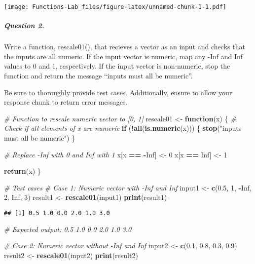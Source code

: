 \documentclass[
]{article}
\newenvironment{Shaded}{\begin{snugshade}}{\end{snugshade}}
\newcommand{\CommentTok}[1]{\textcolor[rgb]{0.56,0.35,0.01}{\textit{#1}}}
\newcommand{\ConstantTok}[1]{\textcolor[rgb]{0.56,0.35,0.01}{#1}}
\newcommand{\ControlFlowTok}[1]{\textcolor[rgb]{0.13,0.29,0.53}{\textbf{#1}}}
\newcommand{\DecValTok}[1]{\textcolor[rgb]{0.00,0.00,0.81}{#1}}
\newcommand{\FloatTok}[1]{\textcolor[rgb]{0.00,0.00,0.81}{#1}}
\newcommand{\FunctionTok}[1]{\textcolor[rgb]{0.13,0.29,0.53}{\textbf{#1}}}
\newcommand{\NormalTok}[1]{#1}
\newcommand{\OtherTok}[1]{\textcolor[rgb]{0.56,0.35,0.01}{#1}}
\newcommand{\SpecialCharTok}[1]{\textcolor[rgb]{0.81,0.36,0.00}{\textbf{#1}}}
\newcommand{\StringTok}[1]{\textcolor[rgb]{0.31,0.60,0.02}{#1}}
\begin{document}
\texttt{[image: Functions-Lab\_files/figure-latex/unnamed-chunk-1-1.pdf]}

\hypertarget{question-2.}{%
\subparagraph{Question 2.}\label{question-2.}}

Write a function, rescale01(), that recieves a vector as an input and
checks that the inputs are all numeric. If the input vector is numeric,
map any -Inf and Inf values to 0 and 1, respectively. If the input
vector is non-numeric, stop the function and return the message ``inputs
must all be numeric''.

Be sure to thoroughly provide test cases. Additionally, ensure to allow
your response chunk to return error messages.

\begin{Shaded}
\begin{Highlighting}[]
\CommentTok{\# Function to rescale numeric vector to [0, 1]}
\NormalTok{rescale01 }\OtherTok{\textless{}{-}} \ControlFlowTok{function}\NormalTok{(x) \{}
  \CommentTok{\# Check if all elements of x are numeric}
  \ControlFlowTok{if}\NormalTok{ (}\SpecialCharTok{!}\FunctionTok{all}\NormalTok{(}\FunctionTok{is.numeric}\NormalTok{(x))) \{}
    \FunctionTok{stop}\NormalTok{(}\StringTok{"inputs must all be numeric"}\NormalTok{)}
\NormalTok{  \}}
  
  \CommentTok{\# Replace {-}Inf with 0 and Inf with 1}
\NormalTok{  x[x }\SpecialCharTok{==} \SpecialCharTok{{-}}\ConstantTok{Inf}\NormalTok{] }\OtherTok{\textless{}{-}} \DecValTok{0}
\NormalTok{  x[x }\SpecialCharTok{==} \ConstantTok{Inf}\NormalTok{] }\OtherTok{\textless{}{-}} \DecValTok{1}
  
  \FunctionTok{return}\NormalTok{(x)}
\NormalTok{\}}

\CommentTok{\# Test cases}
\CommentTok{\# Case 1: Numeric vector with {-}Inf and Inf}
\NormalTok{input1 }\OtherTok{\textless{}{-}} \FunctionTok{c}\NormalTok{(}\FloatTok{0.5}\NormalTok{, }\DecValTok{1}\NormalTok{, }\SpecialCharTok{{-}}\ConstantTok{Inf}\NormalTok{, }\DecValTok{2}\NormalTok{, }\ConstantTok{Inf}\NormalTok{, }\DecValTok{3}\NormalTok{)}
\NormalTok{result1 }\OtherTok{\textless{}{-}} \FunctionTok{rescale01}\NormalTok{(input1)}
\FunctionTok{print}\NormalTok{(result1)}
\end{Highlighting}
\end{Shaded}

\begin{verbatim}
## [1] 0.5 1.0 0.0 2.0 1.0 3.0
\end{verbatim}

\begin{Shaded}
\begin{Highlighting}[]
\CommentTok{\# Expected output: 0.5  1.0  0.0  2.0  1.0  3.0}

\CommentTok{\# Case 2: Numeric vector without {-}Inf and Inf}
\NormalTok{input2 }\OtherTok{\textless{}{-}} \FunctionTok{c}\NormalTok{(}\FloatTok{0.1}\NormalTok{, }\FloatTok{0.8}\NormalTok{, }\FloatTok{0.3}\NormalTok{, }\FloatTok{0.9}\NormalTok{)}
\NormalTok{result2 }\OtherTok{\textless{}{-}} \FunctionTok{rescale01}\NormalTok{(input2)}
\FunctionTok{print}\NormalTok{(result2)}
\end{Highlighting}
\end{Shaded}
\end{document}
